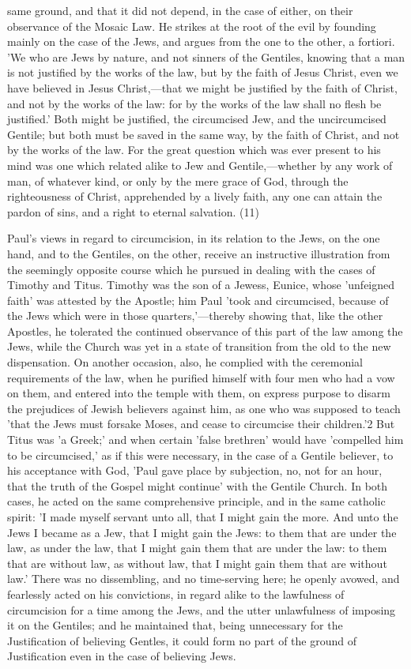 \documentclass[
]{book}
\begin{document}
same ground, and that it did not depend, in the case of either, on their observance of the Mosaic Law. He strikes at the root of the evil by founding mainly on the case of the Jews, and argues from the one to the other, a fortiori. 'We who are Jews by nature, and not sinners of the Gentiles, knowing that a man is not justified by the works of the law, but by the faith of Jesus Christ, even we have believed in Jesus Christ,---that we might be justified by the faith of Christ, and not by the works of the law: for by the works of the law shall no flesh be justified.' Both might be justified, the circumcised Jew, and the uncircumcised Gentile; but both must be saved in the same way, by the faith of Christ, and not by the works of the law. For the great question which was ever present to his mind was one which related alike to Jew and Gentile,---whether by any work of man, of whatever kind, or only by the mere grace of God, through the righteousness of Christ, apprehended by a lively faith, any one can attain the pardon of sins, and a right to eternal salvation. (11)

Paul's views in regard to circumcision, in its relation to the Jews, on the one hand, and to the Gentiles, on the other, receive an instructive illustration from the seemingly opposite course which he pursued in dealing with the cases of Timothy and Titus. Timothy was the son of a Jewess, Eunice, whose 'unfeigned faith' was attested by the Apostle; him Paul 'took and circumcised, because of the Jews which were in those quarters,'---thereby showing that, like the other Apostles, he tolerated the continued observance of this part of the law among the Jews, while the Church was yet in a state of transition from the old to the new dispensation. On another occasion, also, he complied with the ceremonial requirements of the law, when he purified himself with four men who had a vow on them, and entered into the temple with them, on express purpose to disarm the prejudices of Jewish believers against him, as one who was supposed to teach 'that the Jews must forsake Moses, and cease to circumcise their children.'2 But Titus was 'a Greek;' and when certain 'false brethren' would have 'compelled him to be circumcised,' as if this were necessary, in the case of a Gentile believer, to his acceptance with God, 'Paul gave place by subjection, no, not for an hour, that the truth of the Gospel might continue' with the Gentile Church. In both cases, he acted on the same comprehensive principle, and in the same catholic spirit: 'I made myself servant unto all, that I might gain the more. And unto the Jews I became as a Jew, that I might gain the Jews: to them that are under the law, as under the law, that I might gain them that are under the law: to them that are without law, as without law, that I might gain them that are without law.' There was no dissembling, and no time-serving here; he openly avowed, and fearlessly acted on his convictions, in regard alike to the lawfulness of circumcision for a time among the Jews, and the utter unlawfulness of imposing it on the Gentiles; and he maintained that, being unnecessary for the Justification of believing Gentles, it could form no part of the ground of Justification even in the case of believing Jews.
\end{document}
